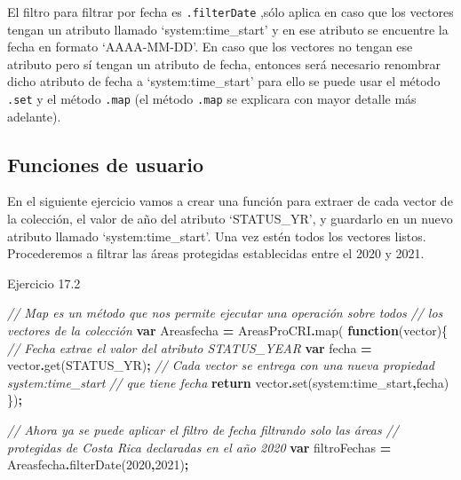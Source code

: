 \documentclass[
  12pt,
  letterpaper,
  twoside]{book}
\newenvironment{Shaded}{\begin{snugshade}}{\end{snugshade}}
\newcommand{\CommentTok}[1]{\textcolor[rgb]{0.56,0.35,0.01}{\textit{#1}}}
\newcommand{\ControlFlowTok}[1]{\textcolor[rgb]{0.13,0.29,0.53}{\textbf{#1}}}
\newcommand{\DecValTok}[1]{\textcolor[rgb]{0.00,0.00,0.81}{#1}}
\newcommand{\FunctionTok}[1]{\textcolor[rgb]{0.00,0.00,0.00}{#1}}
\newcommand{\KeywordTok}[1]{\textcolor[rgb]{0.13,0.29,0.53}{\textbf{#1}}}
\newcommand{\NormalTok}[1]{#1}
\newcommand{\OperatorTok}[1]{\textcolor[rgb]{0.81,0.36,0.00}{\textbf{#1}}}
\newcommand{\StringTok}[1]{\textcolor[rgb]{0.31,0.60,0.02}{#1}}
\begin{document}
El filtro para filtrar por fecha es \texttt{.filterDate} ,sólo aplica en caso que los vectores tengan un atributo llamado `system:time\_start' y en ese atributo se encuentre la fecha en formato `AAAA-MM-DD'. En caso que los vectores no tengan ese atributo pero sí tengan un atributo de fecha, entonces será necesario renombrar dicho atributo de fecha a `system:time\_start' para ello se puede usar el método \texttt{.set} y el método \texttt{.map} (el método \texttt{.map} se explicara con mayor detalle más adelante).

\hypertarget{funciones-de-usuario}{%
\subsection{Funciones de usuario}\label{funciones-de-usuario}}

En el siguiente ejercicio vamos a crear una función para extraer de cada vector de la colección, el valor de año del atributo `STATUS\_YR', y guardarlo en un nuevo atributo llamado `system:time\_start'. Una vez estén todos los vectores listos. Procederemos a filtrar las áreas protegidas establecidas entre el 2020 y 2021.

Ejercicio 17.2

\begin{Shaded}
\begin{Highlighting}[]
\CommentTok{// Map es un método que nos permite ejecutar una operación sobre todos }
\CommentTok{// los vectores de la colección}
\KeywordTok{var}\NormalTok{ Areasfecha }\OperatorTok{=}\NormalTok{ AreasProCRI}\OperatorTok{.}\FunctionTok{map}\NormalTok{( }\KeywordTok{function}\NormalTok{(vector)\{ }
  \CommentTok{// Fecha extrae el valor del atributo \textquotesingle{}STATUS\_YEAR\textquotesingle{}}
  \KeywordTok{var}\NormalTok{ fecha }\OperatorTok{=}\NormalTok{ vector}\OperatorTok{.}\FunctionTok{get}\NormalTok{(}\StringTok{\textquotesingle{}STATUS\_YR\textquotesingle{}}\NormalTok{)}\OperatorTok{;}   
  \CommentTok{// Cada vector se entrega con una nueva propiedad \textquotesingle{}system:time\_start\textquotesingle{} }
  \CommentTok{// que tiene fecha}
  \ControlFlowTok{return}\NormalTok{ vector}\OperatorTok{.}\FunctionTok{set}\NormalTok{(}\StringTok{\textquotesingle{}system:time\_start\textquotesingle{}}\OperatorTok{,}\NormalTok{fecha)}
\NormalTok{\})}\OperatorTok{;} 

\CommentTok{// Ahora ya se puede aplicar el filtro de fecha filtrando solo las áreas }
\CommentTok{// protegidas de Costa Rica declaradas en el año 2020}
\KeywordTok{var}\NormalTok{ filtroFechas }\OperatorTok{=}\NormalTok{ Areasfecha}\OperatorTok{.}\FunctionTok{filterDate}\NormalTok{(}\DecValTok{2020}\OperatorTok{,}\DecValTok{2021}\NormalTok{)}\OperatorTok{;} 
\end{Highlighting}
\end{Shaded}
\end{document}
